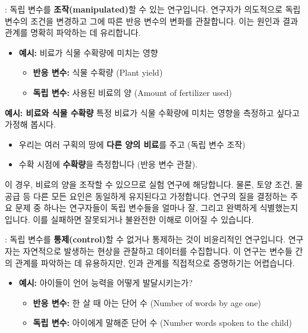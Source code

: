 \documentclass[11pt,a4paper]{article}
\begin{document}
\begin{tcolorbox}[mybox, title={연구의 유형 (1/2): 실험 연구 (Experimental Study)}]
: 독립 변수를 \textbf{조작(manipulated)}할 수 있는 연구입니다. 연구자가 의도적으로 독립 변수의 조건을 변경하고 그에 따른 반응 변수의 변화를 관찰합니다. 이는 원인과 결과 관계를 명확히 파악하는 데 유리합니다.
\begin{itemize}
    \item \textbf{예시:} 비료가 식물 수확량에 미치는 영향
    \begin{itemize}
        \item \textbf{반응 변수:} 식물 수확량 (Plant yield)
        \item \textbf{독립 변수:} 사용된 비료의 양 (Amount of fertilizer used)
    \end{itemize}
\end{itemize}
\end{tcolorbox}

\begin{examplebox}
\textbf{예시: 비료와 식물 수확량}
특정 비료가 식물 수확량에 미치는 영향을 측정하고 싶다고 가정해 봅시다.
\begin{itemize}
    \item 우리는 여러 구획의 땅에 \textbf{다른 양의 비료}를 주고 (독립 변수 조작)
    \item 수확 시점에 \textbf{수확량}을 측정합니다 (반응 변수 관찰).
\end{itemize}
이 경우, 비료의 양을 조작할 수 있으므로 실험 연구에 해당합니다. 물론, 토양 조건, 물 공급 등 다른 모든 요인은 동일하게 유지된다고 가정합니다. 연구의 질을 결정하는 주요 문제 중 하나는 연구자들이 독립 변수들을 얼마나 잘, 그리고 완벽하게 식별했는지입니다. 이를 실패하면 잘못되거나 불완전한 이해로 이어질 수 있습니다.
\end{examplebox}

\begin{tcolorbox}[mybox, title={연구의 유형 (2/2): 관찰 연구 (Observational Study)}]
: 독립 변수를 \textbf{통제(control)}할 수 없거나 통제하는 것이 비윤리적인 연구입니다. 연구자는 자연적으로 발생하는 현상을 관찰하고 데이터를 수집합니다. 이 연구는 변수들 간의 관계를 파악하는 데 유용하지만, 인과 관계를 직접적으로 증명하기는 어렵습니다.
\begin{itemize}
    \item \textbf{예시:} 아이들이 언어 능력을 어떻게 발달시키는가?
    \begin{itemize}
        \item \textbf{반응 변수:} 한 살 때 아는 단어 수 (Number of words by age one)
        \item \textbf{독립 변수:} 아이에게 말해준 단어 수 (Number words spoken to the child)
    \end{itemize}
\end{itemize}
\end{tcolorbox}
\end{document}

